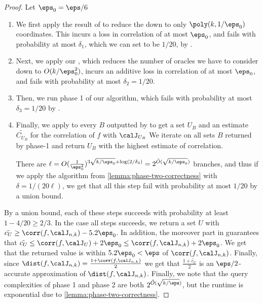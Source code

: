 \begin{proof}
Let $\eps_0 = \eps/6$
\begin{enumerate}
    \item We first apply the result of \cite{junta-coordinate-oracles} to reduce the  down to only $\poly(k,1/\eps_0)$ coordinates.
This incurs a loss in correlation of at most $\eps_0$, and fails with probability at most $\delta_1$, which we can set to be $1/20$, by .
\item Next, we apply our , which reduces the number of oracles we have to consider down to $O(k/\eps_0^2)$, incurs an additive loss in correlation of at most $\eps_0$, and fails with probability at most $\delta_2 = 1/20$.
\item Then, we run phase 1 of our algorithm, which fails with probability at most $\delta_3 = 1/20$ by .
\item 
Finally, we apply  to every $B$ outputted by  to get a set $U_B$ and an estimate $\tilde{C_{U_B}}$ for the correlation of $f$ with $\calJ_{U_B}$ 
We iterate on all sets $B$ returned by phase-1 and return $U_B$ with the highest estimate of correlation.



    There are $\ell = O(\frac{1}{\eps_0^2})^{3\sqrt{k/\eps_0} + \log(2/\delta_3)} = 2^{\tilde{O}(\sqrt{k/\eps_0})}$ branches, and thus if we apply the algorithm from \cref{lemma:phase-two-correctness} with $\delta = 1/(20\ell)$, we get that all this step fail with probability at most $1/20$ by a union bound. 
\end{enumerate}

By a union bound, each of these steps succeeds with probability at least $1 - 4/20 \geq 2/3$.
In the case all steps succeeds, we return a set $U$ with $\tilde{c_U} \ge \corr(f, \calJ_{n,k})-5.2\eps_0$. In addition, the moreover part in  guarantees that $\tilde{c_U} \le \corr(f, \calJ_{U}) + 2\eps_0 \le \corr(f, \calJ_{n,k}) + 2\eps_0$. We get that the returned value is within $5.2\eps_0 < \eps$ of $\corr(f,\calJ_{n,k})$.
Finally, since $\dist(f,\calJ_{n,k}) = \frac{1+\corr(f,\calJ_{n,k})}{2}$ we get that $\frac{1+ \tilde{c_U}}{2}$ is an $\eps/2$-accurate approximation of $\dist(f,\calJ_{n,k})$. Finally, we note that the query complexities of phase 1 and phase 2 are both $2^{\Tilde{O}(\sqrt{k/\eps})}$, but the runtime is exponential due to \cref{lemma:phase-two-correctness}.
\end{proof}

